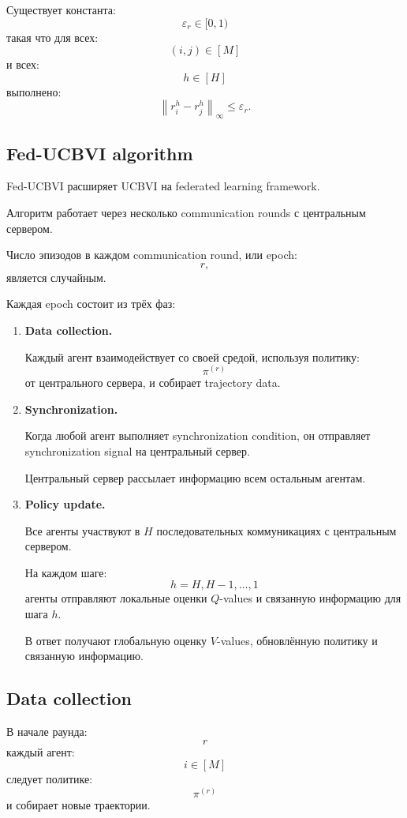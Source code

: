 \documentclass[12pt,a4paper]{article}
\begin{document}
Существует константа:
\[
\varepsilon_r\in[0,1)
\]
такая что для всех:
\[
(i,j)\in[M]
\]
и всех:
\[
h\in[H]
\]
выполнено:
\[
\left\|
r_i^h-r_j^h
\right\|_\infty
\le
\varepsilon_r.
\]

\subsection{Fed-UCBVI algorithm}

Fed-UCBVI расширяет UCBVI на federated learning framework.

Алгоритм работает через несколько communication rounds с центральным сервером.

Число эпизодов в каждом communication round, или epoch:
\[
r,
\]
является случайным.

Каждая epoch состоит из трёх фаз:

\begin{enumerate}
    \item \textbf{Data collection.}

    Каждый агент взаимодействует со своей средой, используя политику:
    \[
    \pi^{(r)}
    \]
    от центрального сервера, и собирает trajectory data.

    \item \textbf{Synchronization.}

    Когда любой агент выполняет synchronization condition, он отправляет synchronization signal на центральный сервер.

    Центральный сервер рассылает информацию всем остальным агентам.

    \item \textbf{Policy update.}

    Все агенты участвуют в $H$ последовательных коммуникациях с центральным сервером.

    На каждом шаге:
    \[
    h=H,H-1,\ldots,1
    \]
    агенты отправляют локальные оценки $Q$-values и связанную информацию для шага $h$.

    В ответ получают глобальную оценку $V$-values, обновлённую политику и связанную информацию.
\end{enumerate}

\subsection{Data collection}

В начале раунда:
\[
r
\]
каждый агент:
\[
i\in[M]
\]
следует политике:
\[
\pi^{(r)}
\]
и собирает новые траектории.
\end{document}
